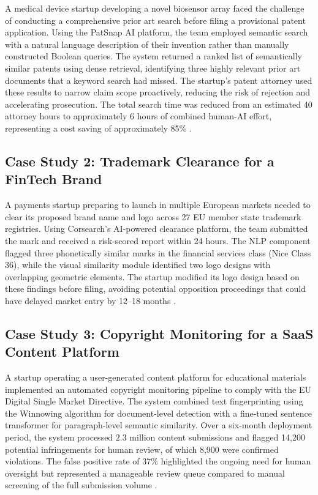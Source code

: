 \documentclass[conference]{IEEEtran}
\begin{document}
A medical device startup developing a novel biosensor array faced the challenge of conducting a comprehensive prior art search before filing a provisional patent application. Using the PatSnap AI platform, the team employed semantic search with a natural language description of their invention rather than manually constructed Boolean queries. The system returned a ranked list of semantically similar patents using dense retrieval, identifying three highly relevant prior art documents that a keyword search had missed. The startup's patent attorney used these results to narrow claim scope proactively, reducing the risk of rejection and accelerating prosecution. The total search time was reduced from an estimated 40 attorney hours to approximately 6 hours of combined human-AI effort, representing a cost saving of approximately 85\% \cite{ref25}.

\subsection{Case Study 2: Trademark Clearance for a FinTech Brand}

A payments startup preparing to launch in multiple European markets needed to clear its proposed brand name and logo across 27 EU member state trademark registries. Using Corsearch's AI-powered clearance platform, the team submitted the mark and received a risk-scored report within 24 hours. The NLP component flagged three phonetically similar marks in the financial services class (Nice Class 36), while the visual similarity module identified two logo designs with overlapping geometric elements. The startup modified its logo design based on these findings before filing, avoiding potential opposition proceedings that could have delayed market entry by 12--18 months \cite{ref29}.

\subsection{Case Study 3: Copyright Monitoring for a SaaS Content Platform}

A startup operating a user-generated content platform for educational materials implemented an automated copyright monitoring pipeline to comply with the EU Digital Single Market Directive. The system combined text fingerprinting using the Winnowing algorithm for document-level detection with a fine-tuned sentence transformer for paragraph-level semantic similarity. Over a six-month deployment period, the system processed 2.3 million content submissions and flagged 14,200 potential infringements for human review, of which 8,900 were confirmed violations. The false positive rate of 37\% highlighted the ongoing need for human oversight but represented a manageable review queue compared to manual screening of the full submission volume \cite{ref30}.
\end{document}
